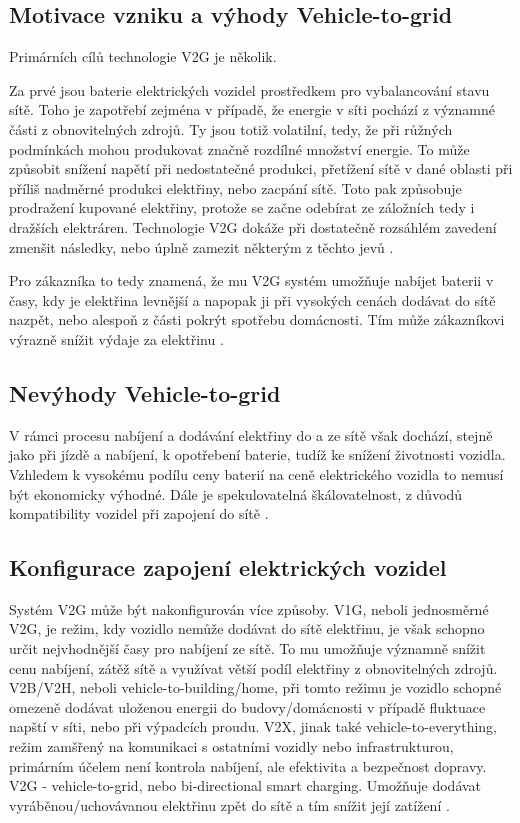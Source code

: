 \documentclass[12pt,a4paper]{Cotmas-2018}
\begin{document}
\subsection{Motivace vzniku a výhody Vehicle-to-grid}
Primárních cílů technologie V2G je několik.

Za prvé jsou baterie elektrických vozidel prostředkem pro vybalancování stavu sítě. Toho je zapotřebí zejména v případě, že energie v síti pochází z významné části z obnovitelných zdrojů. Ty jsou totiž volatilní, tedy, že při růžných podmínkách mohou produkovat značně rozdílné množství energie. To může způsobit snížení napětí při nedostatečné produkci, přetížení sítě v dané oblasti při příliš nadměrné produkci elektřiny, nebo zacpání sítě. Toto pak způsobuje prodražení kupované elektřiny, protože se začne odebírat ze záložních tedy i dražších elektráren. Technologie V2G dokáže při dostatečně rozsáhlém zavedení zmenšit následky, nebo úplně zamezit některým z těchto jevů 
\cite{Greaker-Hagem-Proost-2022}.

Pro zákazníka to tedy znamená, že mu V2G systém umožňuje nabíjet baterii v časy, kdy je elektřina levnější a napopak ji při vysokých cenách dodávat do sítě nazpět, nebo alespoň z části pokrýt spotřebu domácnosti. Tím může zákazníkovi výrazně snížit výdaje za elektřinu 
\cite{Virta-Ltd-2021}.

\subsection{Nevýhody Vehicle-to-grid}
V rámci procesu nabíjení a dodávání elektřiny do a ze sítě však dochází, stejně jako při jízdě a nabíjení, k opotřebení baterie, tudíž ke snížení životnosti vozidla. Vzhledem k vysokému podílu ceny baterií na ceně elektrického vozidla to nemusí být ekonomicky výhodné.
Dále je spekulovatelná škálovatelnost, z důvodů kompatibility vozidel při zapojení do sítě 
\cite{Lakshmi-Divya-Sravani-2019}.

\subsection{Konfigurace zapojení elektrických vozidel}
Systém V2G může být nakonfigurován více způsoby.
V1G, neboli jednosměrné V2G, je režim, kdy vozidlo nemůže dodávat do sítě elektřinu,
je však schopno určit nejvhodnější časy pro nabíjení ze sítě. To mu umožňuje významně snížit cenu nabíjení, zátěž sítě a využívat větší podíl elektřiny z obnovitelných zdrojů.
V2B/V2H, neboli vehicle-to-building/home, při tomto režimu je vozidlo schopné omezeně dodávat uloženou energii do budovy/domácnosti v případě fluktuace napští v síti, nebo při výpadcích proudu.
V2X, jinak také vehicle-to-everything, režim zamšřený na komunikaci s ostatními vozidly nebo infrastrukturou, primárním účelem není kontrola nabíjení, ale efektivita a bezpečnost dopravy.
V2G - vehicle-to-grid, nebo bi-directional smart charging. Umožňuje dodávat vyráběnou/uchovávanou elektřinu zpět do sítě a tím snížit její zatížení 
\cite{Svarc-2022}.
\end{document}
